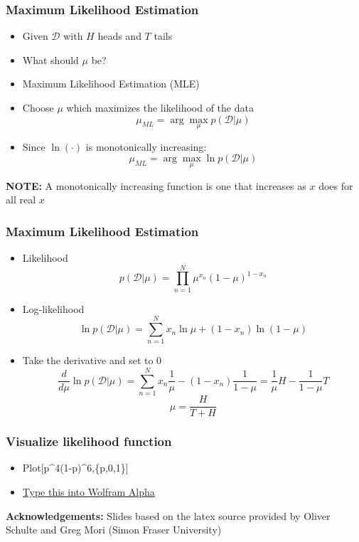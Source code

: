 \documentclass{beamer}
\begin{document}
\begin{frame}
  \frametitle{Maximum Likelihood Estimation}
  \begin{itemize}
  \item Given $\mathcal{D}$ with $H$ heads and $T$ tails
  \item What should $\mu$ be?
  \item Maximum Likelihood Estimation (MLE)
  \item Choose $\mu$ which maximizes the likelihood of the data
    \[ \mu_{ML} = \arg \max_{\mu} p(\mathcal{D}|\mu) \]
  \item Since $\ln(\cdot)$ is monotonically increasing:
     \[ \mu_{ML} = \arg \max_{\mu} \ln p(\mathcal{D}|\mu) \]
  \end{itemize}
  \tiny
  \textbf{NOTE:} A monotonically increasing function is one that increases as $x$ does for all real $x$
\end{frame}

\begin{frame}
  \frametitle{Maximum Likelihood Estimation}
  \begin{itemize}
  \item Likelihood
    \[ p(\mathcal{D}|\mu) = \prod_{n=1}^{N} \mu^{x_n} (1-\mu)^{1-x_n} \]
  \item Log-likelihood
    \[ \ln p(\mathcal{D}|\mu) = \sum_{n=1}^{N} x_n \ln \mu + (1-x_n) \ln (1-\mu) \]
  \item Take the derivative and set to 0 \pause
    \[ \frac{d}{d \mu } \ln p(\mathcal{D}|\mu) = \sum_{n=1}^{N} x_n \frac{1}{\mu} - (1-x_n) \frac{1}{1-\mu}  = \frac{1}{\mu} H - \frac{1}{1-\mu} T \]
    \[ \mu = \frac{H}{T + H} \]
  \end{itemize}
\end{frame}

\begin{frame}
  \frametitle{Visualize likelihood function}
  \begin{itemize}
  \item Plot[p\textasciicircum4(1-p)\textasciicircum6,\{p,0,1\}]
  \item \href{https://www.wolframalpha.com/}{Type this into Wolfram Alpha}
  \end{itemize}
\end{frame}

\begin{frame}
\textbf{Acknowledgements:} Slides based on the latex source provided by Oliver Schulte and Greg Mori (Simon Fraser University)
\end{frame}
\end{document}
